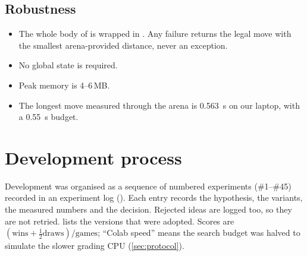 \subsection{Robustness}
\begin{itemize}
  \item The whole body of  is wrapped in . Any failure
        returns the legal move with the smallest arena-provided distance, never an exception.
  \item No global state is required.
  \item Peak memory is 4--6\,MB.
  \item The longest move measured through the arena is \SI{0.563}{\second} on our laptop, with
        a \SI{0.55}{\second} budget.
\end{itemize}

\section{Development process}
\label{sec:process}

Development was organised as a sequence of numbered experiments (\#1--\#45) recorded in an
experiment log (). Each entry records the hypothesis, the variants,
the measured numbers and the decision. Rejected ideas are logged too, so they are not retried.
 lists the versions that were adopted. Scores are
$(\text{wins} + \tfrac12\text{draws})/\text{games}$; ``Colab speed'' means the search budget was
halved to simulate the slower grading CPU (\cref{sec:protocol}).

